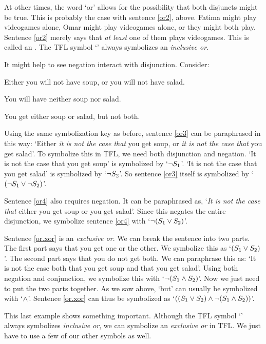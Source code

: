 At other times, the word `or' allows for the possibility that both disjuncts might be true. This is probably the case with sentence \ref{or2}, above. Fatima might play videogames alone, Omar might play videogames alone, or they might both play. Sentence \ref{or2} merely says that \emph{at least} one of them plays videogames. This is called an . The TFL symbol `\eor' always symbolizes an \emph{inclusive or}.

It might help to see negation interact with disjunction. Consider:
	\begin{earg}
		\item[\ex{or3}] Either you will not have soup, or you will not have salad.
		\item[\ex{or4}] You will have neither soup nor salad.
		\item[\ex{or.xor}] You get either soup or salad, but not both.
	\end{earg}
Using the same symbolization key as before, sentence \ref{or3} can be paraphrased in this way: `Either \emph{it is not the case that} you get soup, or \emph{it is not the case that} you get salad'. To symbolize this in TFL, we need both disjunction and negation. `It is not the case that you get soup' is symbolized by `$\neg S_1$'. `It is not the case that you get salad' is symbolized by `$\neg S_2$'. So sentence \ref{or3} itself is symbolized by `$(\neg S_1 \vee \neg S_2)$'.

Sentence \ref{or4} also requires negation. It can be paraphrased as, `\emph{It is not the case that} either you get soup or you get salad'. Since this negates the entire disjunction, we symbolize sentence \ref{or4} with `$\neg (S_1 \vee S_2)$'.

Sentence \ref{or.xor} is an \emph{exclusive or}. We can break the sentence into two parts. The first part says that you get one or the other. We symbolize this as `$(S_1 \vee S_2)$'. The second part says that you do not get both. We can paraphrase this as: `It is not the case both that you get soup and that you get salad'. Using both negation and conjunction, we symbolize this with `$\neg(S_1 \wedge S_2)$'. Now we just need to put the two parts together. As we saw above, `but' can usually be symbolized with `$\wedge$'. Sentence \ref{or.xor} can thus be symbolized as `$((S_1 \vee S_2) \wedge \neg(S_1 \wedge S_2))$'.

This last example shows something important. Although the TFL symbol `\eor' always symbolizes \emph{inclusive or}, we can symbolize an \emph{exclusive or} in {TFL}. We just have to use a few of our other symbols as well.

